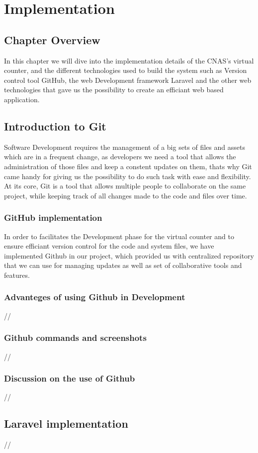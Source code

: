 \chapter{Implementation}
\section{Chapter Overview}
In this chapter we will dive into the implementation details of the CNAS's virtual counter, and the different technologies used to build the system such as Version control tool GitHub, the web Development framework Laravel and the other web technologies that gave us the possibility to create an efficiant web based application.
\section{Introduction to Git }
Software Development requires the management of a big sets of files and assets which are in a frequent change, as developers we need a tool that allows the administration of those files and keep a constent updates on them, thats why Git came handy for giving us the possibility to do such task with ease and flexibility. At its core, Git is a tool that allows multiple people to collaborate on the same project, while keeping track of all changes made to the code and files over time.
\subsection{GitHub implementation}
In order to facilitates the Development phase for the virtual counter and to ensure efficiant version control for the code and system files, we have implemented Github in our project, which provided us with centralized repository that we can use for managing updates as well as set of collaborative tools and features. 
\subsection{Advanteges of using Github in Development}
//
\subsection{Github commands and screenshots  }
//
\subsection{Discussion on the use of Github}
//
\section {Laravel implementation}
//
